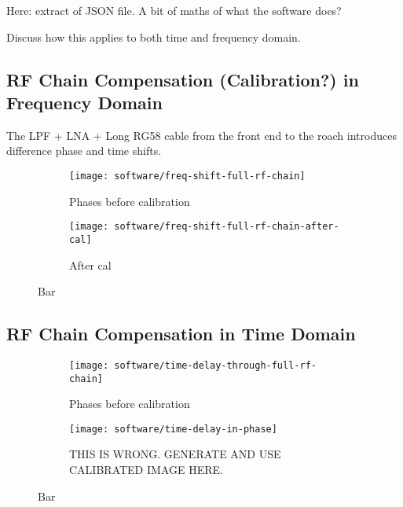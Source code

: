 Here: extract of JSON file.
A bit of maths of what the software does?

Discuss how this applies to both time and frequency domain.

\subsection{RF Chain Compensation (Calibration?) in Frequency Domain}
The LPF + LNA + Long RG58 cable from the front end to the roach introduces difference phase and time shifts. 

\begin{figure}
  \centering
  \begin{subfigure}[b]{0.49\textwidth}
    \centering
    \texttt{[image: software/freq-shift-full-rf-chain]}
    \caption{Phases before calibration}
  \end{subfigure}
  \begin{subfigure}[b]{0.49\textwidth}
    \centering
    \texttt{[image: software/freq-shift-full-rf-chain-after-cal]}
    \caption{After cal}
  \end{subfigure}
  \caption{Bar}
\end{figure}

\subsection{RF Chain Compensation in Time Domain}

\begin{figure}
  \centering
  \begin{subfigure}[b]{0.49\textwidth}
    \centering
    \texttt{[image: software/time-delay-through-full-rf-chain]}
    \caption{Phases before calibration}
  \end{subfigure}
  \begin{subfigure}[b]{0.49\textwidth}
    \centering
    \texttt{[image: software/time-delay-in-phase]}
    \caption{THIS IS WRONG. GENERATE AND USE CALIBRATED IMAGE HERE.}
  \end{subfigure}
  \caption{Bar}
\end{figure}
